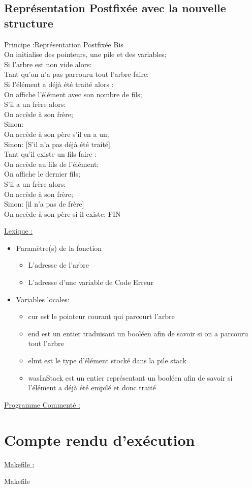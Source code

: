 \documentclass[a4paper]{article}
\newcommand\tab[1][1cm]{\hspace*{#1}}
\begin{document}
\subsection{Représentation Postfixée avec la nouvelle structure}

\begin{algorithm}
Principe :Représentation Postfixée Bis
\\
\tab On initialise des pointeurs, une pile et des variables;
\\
\tab Si l'arbre est non vide alors:
\\
\tab \tab Tant qu'on n'a pas parcouru tout l'arbre faire:
\\
\tab \tab \tab Si l'élément a déjà été traité alors :
\\
\tab \tab \tab \tab On affiche l'élément avec son nombre de fils;
\\
\tab \tab \tab \tab S'il a un frère alors:
\\
\tab \tab \tab \tab \tab On accède à son frère;
\\
\tab \tab \tab \tab Sinon: 
\\
\tab \tab \tab \tab \tab On accède à son père s'il en a un;
\\
\tab \tab \tab Sinon: [S'il n'a pas déjà été traité]
\\
\tab \tab \tab \tab Tant qu'il existe un fils faire :
\\
\tab \tab \tab \tab \tab On accède au fils de l'élément;
\\
\tab \tab \tab \tab On affiche le dernier fils;
\\
\tab \tab \tab \tab S'il a un frère alors:
\\
\tab \tab \tab \tab \tab On accède à son frère;
\\
\tab \tab \tab \tab Sinon: [il n'a pas de frère]
\\
\tab \tab \tab \tab \tab On accède à son père si il existe;
FIN
\end{algorithm}
\underline{Lexique :}
\begin{itemize}
\item Paramètre(s) de la fonction  
\begin{itemize}
\item L'adresse de l'arbre
\item L'adresse d'une variable de Code Erreur
\end{itemize}
\item Variables locales:
\begin{itemize}
\item cur est le pointeur courant qui parcourt l'arbre
\item end est un entier traduisant un booléen afin de savoir si on a parcouru tout l'arbre
\item elmt  est le type d'élément stocké dans la pile stack 
\item wasInStack est un entier représentant un booléen afin de savoir si l'élément a déjà été empilé et donc traité
\end{itemize}
\end{itemize}
\underline{Programme Commenté :}


\section{Compte rendu d'exécution}

\underline{Makefile :}
\begin{center}

Makefile
\end{center}
\end{document}
